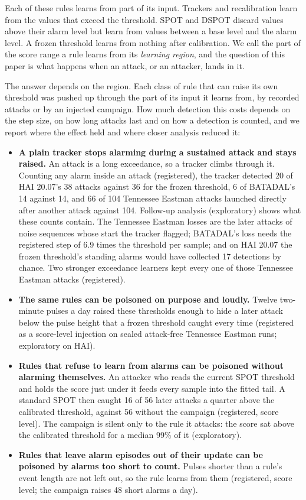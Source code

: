 \documentclass[sigconf,review,anonymous]{acmart}
\begin{document}
Each of these rules learns from part of its input. Trackers and recalibration learn from the
values that exceed the threshold. SPOT and DSPOT discard values above their alarm level but learn
from values between a base level and the alarm level. A frozen threshold learns from nothing after
calibration. We call the part of the score range a rule learns from its \emph{learning region},
and the question of this paper is what happens when an attack, or an attacker, lands in it.

The answer depends on the region. Each class of rule that can raise its own threshold was pushed up
through the part of its input it learns from, by recorded attacks or by an injected campaign. How much
detection this costs depends on the step size, on how long attacks last and on how a detection is
counted, and we report where the effect held and where closer analysis reduced it:

\begin{itemize}
\item \textbf{A plain tracker stops alarming during a sustained attack and stays raised.} An attack is
  a long exceedance, so a tracker climbs through it. Counting any alarm inside an attack (registered),
  the tracker detected 20 of HAI 20.07's 38 attacks against 36 for the frozen threshold, 6 of BATADAL's
  14 against 14, and 66 of 104 Tennessee Eastman attacks launched directly after another attack against
  104. Follow-up analysis (exploratory) shows what these counts contain. The Tennessee Eastman losses
  are the later attacks of noise sequences whose start the tracker flagged; BATADAL's loss needs the
  registered step of 6.9 times the threshold per sample; and on HAI 20.07 the frozen threshold's
  standing alarms would have collected 17 detections by chance. Two stronger exceedance learners kept
  every one of those Tennessee Eastman attacks (registered).
\item \textbf{The same rules can be poisoned on purpose and loudly.} Twelve two-minute pulses a
  day raised these thresholds enough to hide a later attack below the pulse height that a frozen
  threshold caught every time (registered as a score-level injection on sealed attack-free Tennessee
  Eastman runs; exploratory on HAI).
\item \textbf{Rules that refuse to learn from alarms can be poisoned without alarming themselves.} An
  attacker who reads the current SPOT threshold and holds the score just under it feeds every sample
  into the fitted tail. A standard SPOT then caught 16 of 56 later attacks a quarter above the
  calibrated threshold, against 56 without the campaign (registered, score level). The campaign is
  silent only to the rule it attacks: the score sat above the calibrated threshold for a median 99\%
  of it (exploratory).
\item \textbf{Rules that leave alarm episodes out of their update can be poisoned by alarms too short
  to count.} Pulses shorter than a rule's event length are not left out, so the rule learns from them
  (registered, score level; the campaign raises 48 short alarms a day).
\end{itemize}
\end{document}
